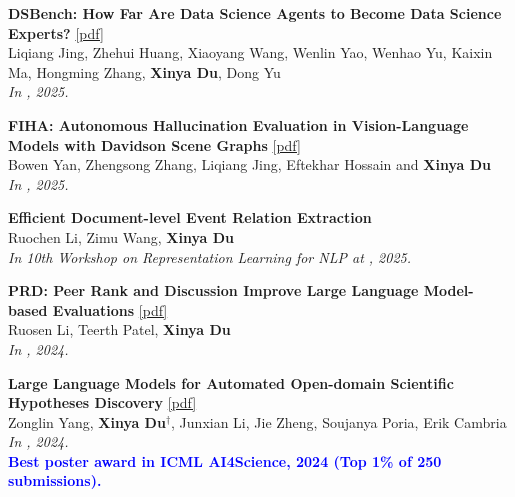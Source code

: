 \begin{enumerate}[{[}1{]},leftmargin=*]
\parbox{\textwidth}{
\item 
{\bf DSBench: How Far Are Data Science Agents to Become Data Science Experts?} 
\href{https://arxiv.org/pdf/2409.07703}{{{[pdf]}}} \\
     Liqiang Jing, Zhehui Huang, Xiaoyang Wang, Wenlin Yao, Wenhao Yu, Kaixin Ma, Hongming Zhang, \textbf{Xinya Du}, Dong Yu \\
{\it In \ICLR, 2025.} \\
}

\parbox{\textwidth}{
\item
{\bf FIHA: Autonomous Hallucination Evaluation in Vision-Language Models with Davidson Scene Graphs}
\href{https://arxiv.org/pdf/2409.13612}{{{[pdf]}}} \\
     Bowen Yan, Zhengsong Zhang, Liqiang Jing, Eftekhar Hossain and \textbf{Xinya Du}\\
{\it In \ACLfinding, 2025.} \\
}

\parbox{\textwidth}{
\item 
{\bf Efficient Document-level Event Relation Extraction} \\
Ruochen Li, Zimu Wang, \textbf{Xinya Du} \\
{\it In 10th Workshop on Representation Learning for NLP at \NAACL, 2025.} \\
}

\item 
{\bf PRD: Peer Rank and Discussion Improve Large Language Model-based Evaluations} 
\href{https://openreview.net/pdf?id=YVD1QqWRaj}{{{[pdf]}}} \\
      Ruosen Li, Teerth Patel, \textbf{Xinya Du} \\
{\it In \TMLR, 2024.} \\

\parbox{\textwidth}{
\item 
{\bf Large Language Models for Automated Open-domain Scientific Hypotheses Discovery} 
\href{https://aclanthology.org/2024.findings-acl.804.pdf}{{[pdf]}} \\
Zonglin Yang, \textbf{Xinya Du}$^{\dagger}$, Junxian Li, Jie Zheng, Soujanya Poria, Erik Cambria \\
{\it In \ACLfinding, 2024.} \\
% 
{\textcolor{blue}{\textbf{Best poster award in ICML AI4Science, 2024 (Top 1\% of 250 submissions).}}} \\
}


\end{enumerate}
